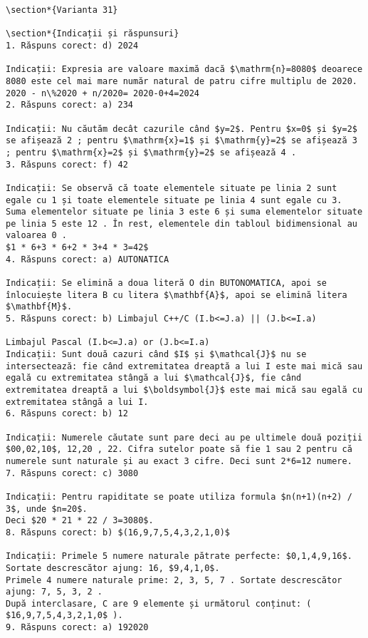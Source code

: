 \begin{verbatim}
\section*{Varianta 31}

\section*{Indicații și răspunsuri}
1. Răspuns corect: d) 2024

Indicații: Expresia are valoare maximă dacă $\mathrm{n}=8080$ deoarece 8080 este cel mai mare număr natural de patru cifre multiplu de 2020.
2020 - n\%2020 + n/2020= 2020-0+4=2024
2. Răspuns corect: a) 234

Indicații: Nu căutăm decât cazurile când $y=2$. Pentru $x=0$ și $y=2$ se afișează 2 ; pentru $\mathrm{x}=1$ și $\mathrm{y}=2$ se afișează 3 ; pentru $\mathrm{x}=2$ și $\mathrm{y}=2$ se afișează 4 .
3. Răspuns corect: f) 42

Indicații: Se observă că toate elementele situate pe linia 2 sunt egale cu 1 și toate elementele situate pe linia 4 sunt egale cu 3. Suma elementelor situate pe linia 3 este 6 și suma elementelor situate pe linia 5 este 12 . În rest, elementele din tabloul bidimensional au valoarea 0 .
$1 * 6+3 * 6+2 * 3+4 * 3=42$
4. Răspuns corect: a) AUTONATICA

Indicații: Se elimină a doua literă O din BUTONOMATICA, apoi se înlocuiește litera B cu litera $\mathbf{A}$, apoi se elimină litera $\mathbf{M}$.
5. Răspuns corect: b) Limbajul C++/C (I.b<=J.a) || (J.b<=I.a)

Limbajul Pascal (I.b<=J.a) or (J.b<=I.a)
Indicații: Sunt două cazuri când $I$ și $\mathcal{J}$ nu se intersectează: fie când extremitatea dreaptă a lui I este mai mică sau egală cu extremitatea stângă a lui $\mathcal{J}$, fie când extremitatea dreaptă a lui $\boldsymbol{J}$ este mai mică sau egală cu extremitatea stângă a lui I.
6. Răspuns corect: b) 12

Indicații: Numerele căutate sunt pare deci au pe ultimele două poziții $00,02,10$, 12,20 , 22. Cifra sutelor poate să fie 1 sau 2 pentru că numerele sunt naturale și au exact 3 cifre. Deci sunt 2*6=12 numere.
7. Răspuns corect: c) 3080

Indicații: Pentru rapiditate se poate utiliza formula $n(n+1)(n+2) / 3$, unde $n=20$.
Deci $20 * 21 * 22 / 3=3080$.
8. Răspuns corect: b) $(16,9,7,5,4,3,2,1,0)$

Indicații: Primele 5 numere naturale pătrate perfecte: $0,1,4,9,16$. Sortate descrescător ajung: 16, $9,4,1,0$.
Primele 4 numere naturale prime: 2, 3, 5, 7 . Sortate descrescător ajung: 7, 5, 3, 2 .
După interclasare, C are 9 elemente și următorul conținut: ( $16,9,7,5,4,3,2,1,0$ ).
9. Răspuns corect: a) 192020


\end{verbatim}
